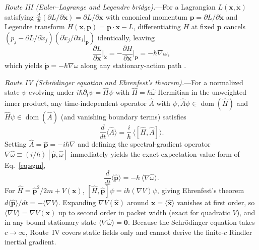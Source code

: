 \documentclass[aps,prd,onecolumn,tightenlines,nofootinbib,notitlepage,10pt,floatfix]{revtex4-2}
\theoremstyle{indentedtheorem}
\begin{document}
\emph{Route III (Euler--Lagrange and Legendre bridge).}---For a Lagrangian $L(\mathbf{x},\dot{\mathbf{x}})$ satisfying $\frac{d}{dt}(\partial L/\partial\dot{\mathbf{x}})=\partial L/\partial\mathbf{x}$ \citep{Euler1744Methodus,Lagrange1788Mecanique} with canonical momentum $\mathbf{p}=\partial L/\partial\dot{\mathbf{x}}$ and Legendre transform $H(\mathbf{x},\mathbf{p})=\mathbf{p}\cdot\dot{\mathbf{x}}-L$, differentiating $H$ at fixed $\mathbf{p}$ cancels $(p_j-\partial L/\partial\dot{x}_j)(\partial\dot{x}_j/\partial x_i|_{\mathbf{p}})$ identically, leaving
\begin{equation}
    \frac{\partial L}{\partial\mathbf{x}}\bigg|_{\dot{\mathbf{x}}} = -\frac{\partial H}{\partial\mathbf{x}}\bigg|_{\mathbf{p}} = -\hbar\nabla\omega ,
    \label{eq:legendre_bridge}
\end{equation}
which yields $\dot{\mathbf{p}}=-\hbar\nabla\omega$ along any stationary-action path \citep{Goldstein2002Classical}.

\emph{Route IV (Schr\"odinger equation and Ehrenfest's theorem).}---For a normalized state $\psi$ evolving under $i\hbar\partial_t\psi=\hat{H}\psi$ with $\hat{H}=\hbar\hat{\omega}$ Hermitian in the unweighted inner product, any time-independent operator $\hat{A}$ with $\psi,\hat{A}\psi\in\operatorname{dom}(\hat{H})$ and $\hat{H}\psi\in\operatorname{dom}(\hat{A})$ (and vanishing boundary terms) satisfies \citep{Ehrenfest1927Bemerkung,Sakurai2020Modern}
\begin{equation}
    \frac{d}{dt}\langle\hat{A}\rangle = \frac{i}{\hbar}\,\big\langle[\hat{H},\hat{A}]\big\rangle .
    \label{eq:ehrenfest_commutator}
\end{equation}
Setting $\hat{A}=\hat{\mathbf{p}}=-i\hbar\nabla$ and defining the spectral-gradient operator $\nabla\hat{\omega}\equiv(i/\hbar)[\hat{\mathbf{p}},\hat{\omega}]$ immediately yields the exact expectation-value form of Eq.~\eqref{eq:sgm},
\begin{equation}
    \frac{d}{dt}\langle\hat{\mathbf{p}}\rangle = -\hbar\,\langle\nabla\hat{\omega}\rangle .
    \label{eq:sgm_expectation}
\end{equation}
For $\hat{H}=\hat{\mathbf{p}}^2/2m+V(\mathbf{x})$, $[\hat{H},\hat{\mathbf{p}}]\psi=i\hbar(\nabla V)\psi$, giving Ehrenfest's theorem $d\langle\hat{\mathbf{p}}\rangle/dt=-\langle\nabla V\rangle$. Expanding $\nabla V(\hat{\mathbf{x}})$ around $\mathbf{x}=\langle\hat{\mathbf{x}}\rangle$ vanishes at first order, so $\langle\nabla V\rangle=\nabla V(\mathbf{x})$ up to second order in packet width (exact for quadratic $V$), and in any bound stationary state $\langle\nabla\hat{\omega}\rangle=\mathbf{0}$. Because the Schr\"odinger equation takes $c\to\infty$, Route~IV covers static fields only and cannot derive the finite-$c$ Rindler inertial gradient.
\end{document}
